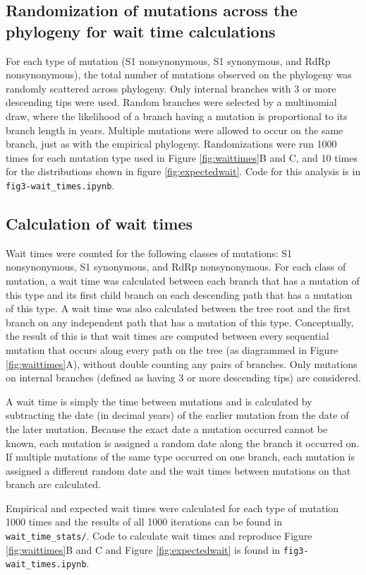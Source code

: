\documentclass[11pt,oneside,letterpaper]{article}
\begin{document}
\subsection*{Randomization of mutations across the phylogeny for wait time calculations}
For each type of mutation (S1 nonsynonymous, S1 synonymous, and RdRp nonsynonymous), the total number of mutations observed on the phylogeny was randomly scattered across phylogeny.
Only internal branches with 3 or more descending tips were used.
Random branches were selected by a multinomial draw, where the likelihood of a branch having a mutation is proportional to its branch length in years.
Multiple mutations were allowed to occur on the same branch, just as with the empirical phylogeny.
Randomizations were run 1000 times for each mutation type used in Figure \ref{fig:waittimes}B and C, and 10 times for the distributions shown in figure \ref{fig:expectedwait}. Code for this analysis is in \texttt{fig3-wait\_times.ipynb}.

\subsection*{Calculation of wait times}
Wait times were counted for the following classes of mutations: S1 nonsynonymous, S1 synonymous, and RdRp nonsynonymous.
For each class of mutation, a wait time was calculated between each branch that has a mutation of this type and its first child branch on each descending path that has a mutation of this type.
A wait time was also calculated between the tree root and the first branch on any independent path that has a mutation of this type.
Conceptually, the result of this is that wait times are computed between every sequential mutation that occurs along every path on the tree (as diagrammed in Figure \ref{fig:waittimes}A), without double counting any pairs of branches.
Only mutations on internal branches (defined as having 3 or more descending tips) are considered.

A wait time is simply the time between mutations and is calculated by subtracting the date (in decimal years) of the earlier mutation from the date of the later mutation.
Because the exact date a mutation occurred cannot be known, each mutation is assigned a random date along the branch it occurred on.
If multiple mutations of the same type occurred on one branch, each mutation is assigned a different random date and the wait times between mutations on that branch are calculated.

Empirical and expected wait times were calculated for each type of mutation 1000 times and the results of all 1000 iterations can be found in \texttt{wait\_time\_stats/}.
Code to calculate wait times and reproduce Figure \ref{fig:waittimes}B and C and Figure \ref{fig:expectedwait} is found in \texttt{fig3-wait\_times.ipynb}.
\end{document}
